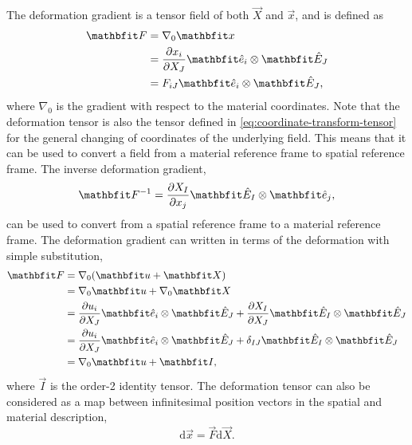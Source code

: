 The deformation gradient is a tensor field of both $\vec{X}$ and $\vec{x}$, and is defined as
\begin{align}
    \vec{F} &= \nabla_{0} \vec{x} \nonumber\\
            &= \frac{\partial x_{i}}{\partial X_{J}} \unitvec_{i} \otimes \Unitvec_{J} \nonumber\\
            &= F_{iJ} \unitvec_{i} \otimes \Unitvec_{J},
\end{align}
where $\nabla_{0}$ is the gradient with respect to the material coordinates.
Note that the deformation tensor is also the tensor defined in \cref{eq:coordinate-transform-tensor} for the general changing of coordinates of the underlying field.
This means that it can be used to convert a field from a material reference frame to spatial reference frame.
The inverse deformation gradient,
\begin{equation}
    \vec{F}^{-1} = \frac{\partial X_{I}}{\partial x_{j}} \Unitvec_{I} \otimes \unitvec_{j},
\end{equation}
can be used to convert from a spatial reference frame to a material reference frame.
The deformation gradient can written in terms of the deformation with simple substitution,
\begin{align}
    \vec{F} &= \nabla_{0} (\vec{u} + \vec{X}) \nonumber\\
            &= \nabla_{0} \vec{u} + \nabla_{0} \vec{X} \nonumber\\
            &= \frac{\partial u_{i}}{\partial X_J} \unitvec_{i} \otimes \Unitvec_{J} + \frac{\partial X_{I}}{\partial X_{J}} \Unitvec_{I} \otimes \Unitvec_{J} \nonumber\\
            &= \frac{\partial u_{i}}{\partial X_J} \unitvec_{i} \otimes \Unitvec_{J} + \delta_{IJ} \Unitvec_{I} \otimes \Unitvec_{J} \nonumber\\
            &= \nabla_{0} \vec{u} + \vec{I},
\end{align}
where $\vec{I}$ is the order-2 identity tensor.
The deformation tensor can also be considered as a map between infinitesimal position vectors in the spatial and material description,
\begin{equation}
    \textrm{d} \vec{x} = \vec{F} \textrm{d} \vec{X}.
\end{equation}

